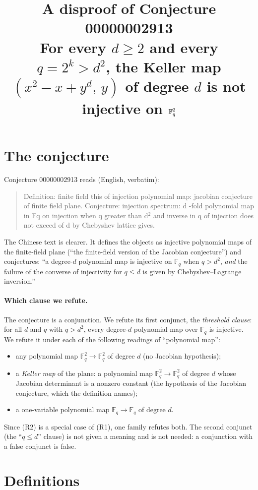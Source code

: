 \documentclass[11pt]{article}
\title{A disproof of Conjecture 00000002913\\[2pt]
\large For every $d\ge2$ and every $q=2^k>d^2$, the Keller map $(x^2-x+y^d,\,y)$ of degree $d$ is not injective on $\F_q^2$}
\date{}
\renewcommand{\_}{\oldus\allowbreak}
\theoremstyle{definition}
\theoremstyle{remark}
\newcommand{\F}{\mathbb{F}}
\begin{document}
\sloppy
\maketitle

\section{The conjecture}

Conjecture 00000002913 reads (English, verbatim):
\begin{quote}
Definition: finite field this of injection polynomial map: jacobian conjecture of finite field
plane. Conjecture: injection spectrum: d -fold polynomial map in F\_q on injection when q greater
than d$^2$ and inverse in q of injection does not exceed of d by Chebyshev lattice gives.
\end{quote}
The Chinese text is clearer. It defines the objects as injective polynomial maps of the
finite-field plane (``the finite-field version of the Jacobian conjecture'') and conjectures:
``a degree-$d$ polynomial map is injective on $\F_q$ when $q>d^2$, \emph{and} the failure of
the converse of injectivity for $q\le d$ is given by Chebyshev--Lagrange inversion.''

\paragraph{Which clause we refute.} The conjecture is a conjunction. We refute its first
conjunct, the \emph{threshold clause}: for all $d$ and $q$ with $q>d^2$, every degree-$d$
polynomial map over $\F_q$ is injective. We refute it under each of the following readings of
``polynomial map'':
\begin{itemize}
\item[(R1)] any polynomial map $\F_q^2\to\F_q^2$ of degree $d$ (no Jacobian hypothesis);
\item[(R2)] a \emph{Keller map} of the plane: a polynomial map $\F_q^2\to\F_q^2$ of degree $d$
whose Jacobian determinant is a nonzero constant (the hypothesis of the Jacobian conjecture, which
the definition names);
\item[(R3)] a one-variable polynomial map $\F_q\to\F_q$ of degree $d$.
\end{itemize}
Since (R2) is a special case of (R1), one family refutes both. The second conjunct (the ``$q\le d$''
clause) is not given a meaning and is not needed: a conjunction with a false conjunct is false.

\section{Definitions}
\end{document}

